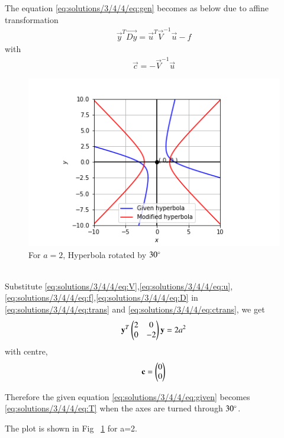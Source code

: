 The equation \eqref{eq:solutions/3/4/4/eq:gen} becomes as below due to affine transformation
\begin{align}
    \vec{y}^T\vec{Dy}=\vec{u}^T\vec{V}^{-1}\vec{u}-f\label{eq:solutions/3/4/4/eq:trans}
\end{align}
with 
\begin{align}
    \vec{c}=-\vec{V}^{-1}\vec{u}\label{eq:solutions/3/4/4/eq:ctrans}
\end{align}
\begin{figure}[ht!]
    \centering
    \includegraphics[width=\columnwidth]{./solutions/3/4/4/Figure}
    \caption{For $a=2$, Hyperbola rotated by $30\degree$}
    \label{eq:solutions/3/4/4/fig:figure1}
\end{figure}\\
Substitute \eqref{eq:solutions/3/4/4/eq:V},\eqref{eq:solutions/3/4/4/eq:u},\eqref{eq:solutions/3/4/4/eq:f},\eqref{eq:solutions/3/4/4/eq:D} in \eqref{eq:solutions/3/4/4/eq:trans} and \eqref{eq:solutions/3/4/4/eq:ctrans}, we get
\begin{align}
    \mathbf{y}^T\begin{pmatrix}2 & 0 \\ 0 & -2\end{pmatrix}\mathbf{y}=2a^2\label{eq:solutions/3/4/4/eq:T}
\end{align}
with centre,
\begin{align}
    \mathbf{c}=\begin{pmatrix}0 \\ 0\end{pmatrix}
\end{align}

Therefore the given equation \eqref{eq:solutions/3/4/4/eq:given} becomes \eqref{eq:solutions/3/4/4/eq:T} when the axes are turned through $30\degree$.

The plot is shown in Fig ~\ref{eq:solutions/3/4/4/fig:figure1} for a=2.
